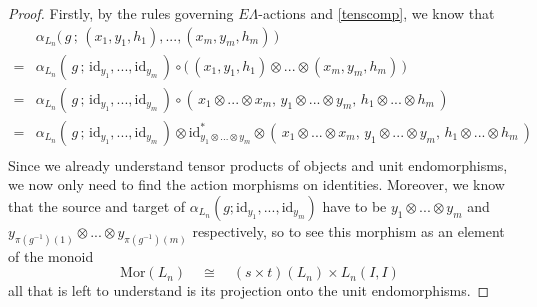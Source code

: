 \documentclass{amsbook} %
\numberwithin{section}{chapter}
\begin{document}
\begin{proof}
Firstly, by the rules governing $E\Lambda$-actions and \cref{tenscomp}, we know that
\[ \begin{array}{rl} 
			& \alpha_{L_n}\big( \, g \, ; \, (x_1, y_1, h_1), ..., (x_m, y_m, h_m) \, \big) \\
			= & \alpha_{L_n}( \, g \, ; \, \mathrm{id}_{y_1}, ..., \mathrm{id}_{y_m} \, ) \circ \big( \, (x_1, y_1, h_1) \otimes ... \otimes (x_m, y_m, h_m) \, \big) \\
			= & \alpha_{L_n}( \, g \, ; \, \mathrm{id}_{y_1}, ..., \mathrm{id}_{y_m} \, ) \circ ( \, x_1 \otimes ... \otimes x_m, \, y_1 \otimes ... \otimes y_m, \, h_1 \otimes ... \otimes h_m \, ) \\
			= & \alpha_{L_n}( \, g \, ; \, \mathrm{id}_{y_1}, ..., \mathrm{id}_{y_m} \, ) \otimes \mathrm{id}_{y_1 \otimes ... \otimes y_m}^* \otimes ( \, x_1 \otimes ... \otimes x_m, \, y_1 \otimes ... \otimes y_m, \, h_1 \otimes ... \otimes h_m \, ) \\
		\end{array}
\]
Since we already understand tensor products of objects and unit endomorphisms, we now only need to find the action morphisms on identities. Moreover, we know that the source and target of $\alpha_{L_n}(g; \mathrm{id}_{y_1}, ..., \mathrm{id}_{y_m})$ have to be $y_1 \otimes ... \otimes y_m$ and $y_{\pi(g^{-1})(1)} \otimes ... \otimes y_{\pi(g^{-1})(m)}$ respectively, so to see this morphism as an element of the monoid
\[ \mathrm{Mor}(L_n) \quad \cong \quad (s \times t)(L_n) \times L_n(I,I) \]
all that is left to understand is its projection onto the unit endomorphisms.


\end{proof}
\end{document}
